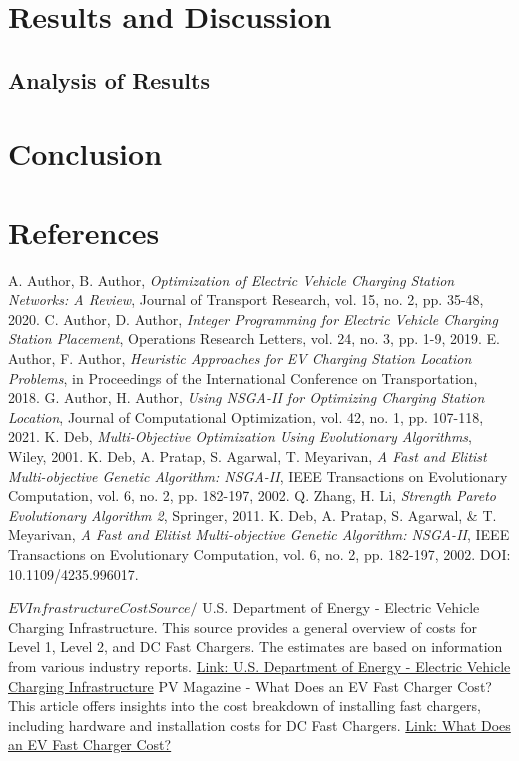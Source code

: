 \documentclass[12pt]{report}
\begin{document}
\chapter{Results and Discussion}


\section{Analysis of Results}


\chapter{Conclusion}


\chapter{References}
\begin{thebibliography}{99}
     A. Author, B. Author, \textit{Optimization of Electric Vehicle Charging Station Networks: A Review}, Journal of Transport Research, vol. 15, no. 2, pp. 35-48, 2020.
     C. Author, D. Author, \textit{Integer Programming for Electric Vehicle Charging Station Placement}, Operations Research Letters, vol. 24, no. 3, pp. 1-9, 2019.
     E. Author, F. Author, \textit{Heuristic Approaches for EV Charging Station Location Problems}, in Proceedings of the International Conference on Transportation, 2018.
     G. Author, H. Author, \textit{Using NSGA-II for Optimizing Charging Station Location}, Journal of Computational Optimization, vol. 42, no. 1, pp. 107-118, 2021.
     K. Deb, \textit{Multi-Objective Optimization Using Evolutionary Algorithms}, Wiley, 2001.
     K. Deb, A. Pratap, S. Agarwal, T. Meyarivan, \textit{A Fast and Elitist Multi-objective Genetic Algorithm: NSGA-II}, IEEE Transactions on Evolutionary Computation, vol. 6, no. 2, pp. 182-197, 2002.
     Q. Zhang, H. Li, \textit{Strength Pareto Evolutionary Algorithm 2}, Springer, 2011.
     K. Deb, A. Pratap, S. Agarwal, \& T. Meyarivan, \textit{A Fast and Elitist Multi-objective Genetic Algorithm: NSGA-II}, IEEE Transactions on Evolutionary Computation, vol. 6, no. 2, pp. 182-197, 2002. DOI: 10.1109/4235.996017.

    $
    EV Infrastructure Cost Source 
    /$
     U.S. Department of Energy - Electric Vehicle Charging Infrastructure. This source provides a general overview of costs for Level 1, Level 2, and DC Fast Chargers. The estimates are based on information from various industry reports. \href{https://www.energy.gov/eere/vehicles/ev-charging-infrastructure}{Link: U.S. Department of Energy - Electric Vehicle Charging Infrastructure}
     PV Magazine - What Does an EV Fast Charger Cost? This article offers insights into the cost breakdown of installing fast chargers, including hardware and installation costs for DC Fast Chargers. \href{https://www.pv-magazine.com/2021/10/18/what-does-an-ev-fast-charger-cost/}{Link: What Does an EV Fast Charger Cost?}

\end{thebibliography}
\end{document}
